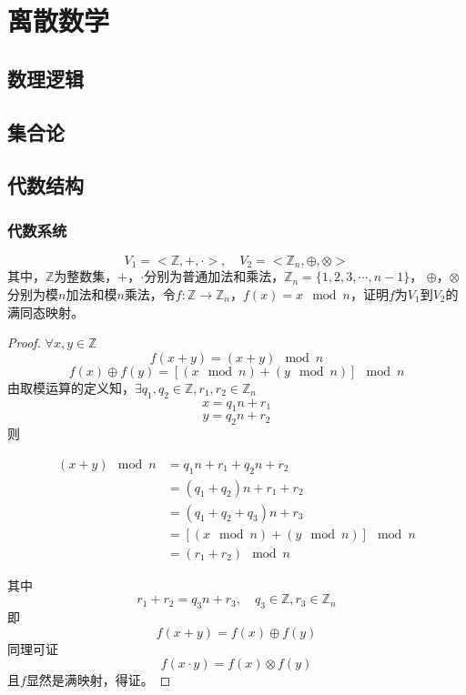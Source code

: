 \chapter{离散数学}

\section{数理逻辑}

\section{集合论}

\section{代数结构}

\subsection{代数系统}

\begin{proposition}

    $$V_1 = <\mathbb{Z}, +, \cdot>, \quad V_2 = <\mathbb{Z}_n, \oplus, \otimes>$$
    其中，$\mathbb{Z}$为整数集，$+$，$\cdot$分别为普通加法和乘法，$\mathbb{Z}_n = \{1, 2, 3, \cdots, n - 1\}$，
    $\oplus$，$\otimes$分别为模$n$加法和模$n$乘法，令$f: \mathbb{Z} \to \mathbb{Z}_n$，$f(x) = x \mod n$，证明$f$为$V_1$到$V_2$的满同态映射。

\end{proposition}

\begin{proof}

    $\forall x, y \in \mathbb{Z}$
    $$f(x + y) = (x + y) \mod n$$
    $$f(x) \oplus f(y) = [(x \mod n) + (y \mod n)] \mod n$$
    由取模运算的定义知，$\exists q_1, q_2 \in \mathbb{Z}, r_1, r_2 \in \mathbb{Z}_n$
    $$x = q_1 n + r_1$$
    $$y = q_2 n + r_2$$
    则
    
    \begin{align*}
        (x + y) \mod n & =  q_1 n + r_1 + q_2 n + r_2 \\
        & = (q_1 + q_2)n + r_1 + r_2 \\
        & = (q_1 + q_2 + q_3)n + r_3 \\
        & = [(x \mod n) + (y \mod n)] \mod n \\
        & = (r_1 + r_2) \mod n
    \end{align*}

    其中
    $$r_1 + r_2 = q_3 n + r_3,\quad q_3 \in \mathbb{Z}, r_3 \in \mathbb{Z}_n$$
    即
    $$f(x + y) = f(x) \oplus f(y)$$
    同理可证
    $$f(x \cdot y) = f(x) \otimes f(y)$$
    且$f$显然是满映射，得证。

\end{proof}


